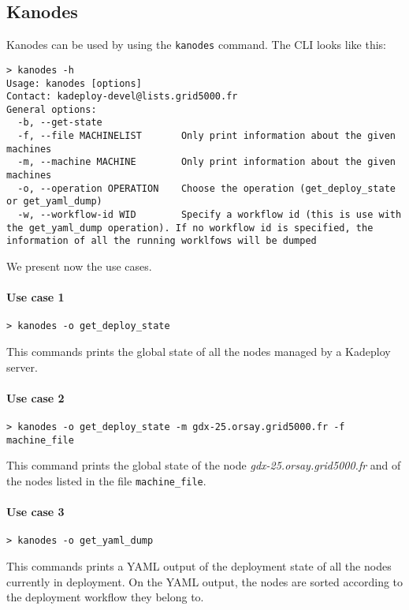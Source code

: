 \documentclass[a4wide,10pt,oneside]{book}
\begin{document}
\subsection{Kanodes}\label{sec:kanodes}
Kanodes can be used by using the \texttt{kanodes} command. The CLI looks like this:
\begin{small}
\begin{verbatim}
> kanodes -h
Usage: kanodes [options]
Contact: kadeploy-devel@lists.grid5000.fr
General options:
  -b, --get-state
  -f, --file MACHINELIST       Only print information about the given machines
  -m, --machine MACHINE        Only print information about the given machines
  -o, --operation OPERATION    Choose the operation (get_deploy_state or get_yaml_dump)
  -w, --workflow-id WID        Specify a workflow id (this is use with the get_yaml_dump operation). If no workflow id is specified, the information of all the running worklfows will be dumped
\end{verbatim}
\end{small}

We present now the use cases.
\paragraph{Use case 1}
\begin{verbatim}
> kanodes -o get_deploy_state
\end{verbatim}
This commands prints the global state of all the nodes managed by a Kadeploy server.

\paragraph{Use case 2}
\begin{verbatim}
> kanodes -o get_deploy_state -m gdx-25.orsay.grid5000.fr -f machine_file
\end{verbatim}
This command prints the global state of the node \textit{gdx-25.orsay.grid5000.fr} and of the nodes listed in the file \texttt{machine\_file}.

\paragraph{Use case 3}
\begin{verbatim}
> kanodes -o get_yaml_dump
\end{verbatim}
This commands prints a YAML output of the deployment state of all the nodes currently in deployment. On the YAML output, the nodes are sorted according to the deployment workflow they belong to.
\end{document}
